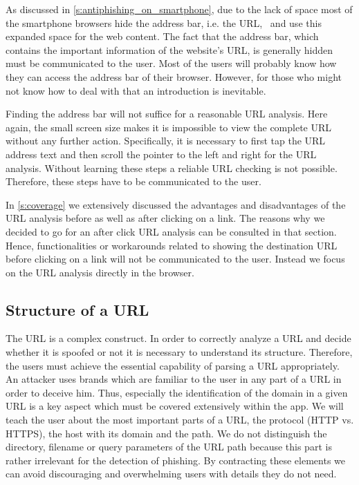 \begin{description}[leftmargin=0cm]
	\item[Invisible Address Bar:] As discussed in \autoref{s:antiphishing_on_smartphone}, due to the lack of space most of the smartphone browsers hide the address bar, i.e. the URL,~\cite{amrutkar2012measuring} and use this expanded space for the web content. 
The fact that the address bar, which contains the important information of the website's URL, is generally hidden must be communicated to the user.
Most of the users will probably know how they can access the address bar of their browser.
However, for those who might not know how to deal with that an introduction is inevitable.

	\item[Analyze Complete URL Via Address Bar:] Finding the address bar will not suffice for a reasonable URL analysis. 
Here again, the small screen size makes it is impossible to view the complete URL without any further action.
Specifically, it is necessary to first tap the URL address text and then scroll the pointer to the left and right for the URL analysis.
Without learning these steps a reliable URL checking is not possible. 
Therefore, these steps have to be communicated to the user.

	\item[Analyze URL After Click:] In \autoref{s:coverage} we extensively discussed the advantages and disadvantages of the URL analysis before as well as after clicking on a link.
The reasons why we decided to go for an after click URL analysis can be consulted in that section.
Hence, functionalities or workarounds related to showing the destination URL before clicking on a link will not be communicated to the user.
Instead we focus on the URL analysis directly in the browser.
\end{description}

\subsection{Structure of a URL}
\label{s:url_structure}
The URL is a complex construct. 
In order to correctly analyze a URL and decide whether it is spoofed or not it is necessary to understand its structure. 
Therefore, the users must achieve the essential capability of parsing a URL appropriately.
An attacker uses brands which are familiar to the user in any part of a URL in order to deceive him. 
Thus, especially the identification of the domain in a given URL is a key aspect which must be covered extensively within the app. 
We will teach the user about the most important parts of a URL, the protocol (HTTP vs. HTTPS), the host with its domain and the path.
We do not distinguish the directory, filename or query parameters of the URL path because this part is rather irrelevant for the detection of phishing.
By contracting these elements we can avoid discouraging and overwhelming users with details they do not need.

